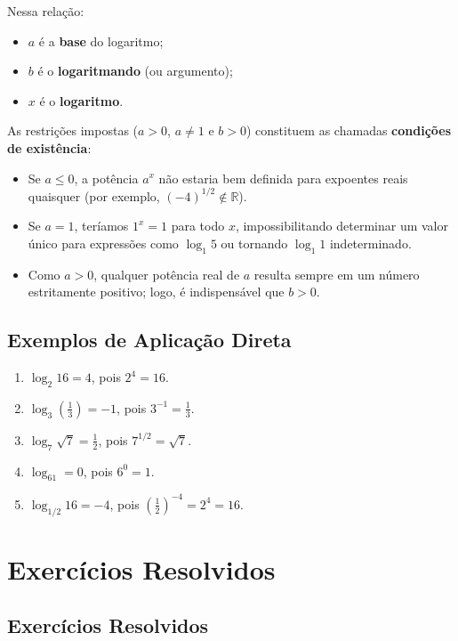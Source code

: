 \documentclass[12pt,a4paper]{report}
\begin{document}
	Nessa relação:
	\begin{itemize}[label=$\circ$]
		\item $a$ é a \textbf{base} do logaritmo;
		\item $b$ é o \textbf{logaritmando} (ou argumento);
		\item $x$ é o \textbf{logaritmo}.
	\end{itemize}
	
	As restrições impostas ($a > 0$, $a \neq 1$ e $b > 0$) constituem as chamadas \textbf{condições de existência}:
	\begin{itemize}[label=$\circ$]
		\item Se $a \leqslant 0$, a potência $a^x$ não estaria bem definida para expoentes reais quaisquer (por exemplo, $(-4)^{1/2} \notin \mathbb{R}$).
		\item Se $a = 1$, teríamos $1^x = 1$ para todo $x$, impossibilitando determinar um valor único para expressões como $\log_1 5$ ou tornando $\log_1 1$ indeterminado.
		\item Como $a > 0$, qualquer potência real de $a$ resulta sempre em um número estritamente positivo; logo, é indispensável que $b > 0$.
	\end{itemize}
	
	\subsection*{Exemplos de Aplicação Direta}
	
	\begin{enumerate}[label=\textbf{\alph*)}]
		\item $\log_2 16 = 4$, pois $2^4 = 16$.
		\item $\log_3 \left(\frac{1}{3}\right) = -1$, pois $3^{-1} = \frac{1}{3}$.
		\item $\log_7 \sqrt{7} = \frac{1}{2}$, pois $7^{1/2} = \sqrt{7}$.
		\item $\log_61 = 0$, pois $6^0 = 1$.
		\item $\log_{1/2} 16 = -4$, pois $\left(\frac{1}{2}\right)^{-4} = 2^4 = 16$.
	\end{enumerate}
	
	\section{Exercícios Resolvidos}
	
	\subsection*{Exercícios Resolvidos}
	
\end{document}
